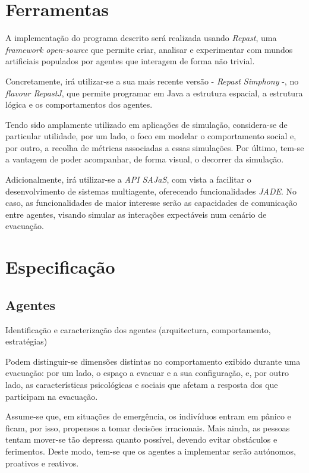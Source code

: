 \documentclass[12pt]{article}
\begin{document}
\begin{titlepage}
\section{Ferramentas}
A implementação do programa descrito será realizada usando \textit{Repast}, uma \textit{framework open-source} que permite criar, analisar e experimentar com mundos artificiais populados por agentes que interagem de forma não trivial.

Concretamente, irá utilizar-se a sua mais recente versão - \textit{Repast Simphony} -, no \textit{flavour RepastJ}, que permite programar em Java a estrutura espacial, a estrutura lógica e os comportamentos dos agentes.

Tendo sido amplamente utilizado em aplicações de simulação, considera-se de particular utilidade, por um lado, o foco em modelar o comportamento social e, por outro, a recolha de métricas associadas a essas simulações. Por último, tem-se a vantagem de poder acompanhar, de forma visual, o decorrer da simulação.

Adicionalmente, irá utilizar-se a \textit{API SAJaS}, com vista a facilitar o desenvolvimento de sistemas multiagente, oferecendo funcionalidades \textit{JADE}. 
No caso, as funcionalidades de maior interesse serão as capacidades de comunicação entre agentes, visando simular as interações expectáveis num cenário de evacuação.

\section{Especificação}
\subsection{Agentes}

Identificação e caracterização dos agentes (arquitectura, comportamento, estratégias)



Podem distinguir-se dimensões distintas no comportamento exibido durante uma evacuação: por um lado, o espaço a evacuar e a sua configuração, e, por outro lado, as características psicológicas e sociais que afetam a resposta dos que participam na evacuação.

Assume-se que, em situações de emergência, os indivíduos entram em pânico e ficam, por isso, propensos a tomar decisões irracionais. Mais ainda, as pessoas tentam mover-se tão depressa quanto possível, devendo evitar obstáculos e ferimentos.
Deste modo, tem-se que os agentes a implementar serão autónomos, proativos e reativos.


\end{titlepage}
\end{document}
